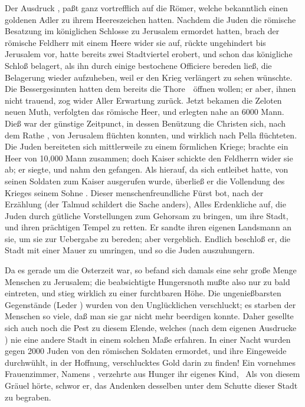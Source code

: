 \begin{aufza}
\begin{aufzb}
\item Der Ausdruck , paßt ganz vortrefflich auf die Römer, welche bekanntlich einen goldenen Adler zu ihrem Heereszeichen hatten. Nachdem die Juden die römische Besatzung im königlichen Schlosse zu Jerusalem ermordet hatten, brach der römische Feldherr  mit einem Heere wider sie auf, rückte ungehindert bis Jerusalem vor, hatte bereits zwei Stadtviertel erobert, und schon das königliche Schloß belagert, als  ihn durch einige bestochene Officiere bereden ließ, die Belagerung wieder aufzuheben, weil er den Krieg verlängert zu sehen wünschte. Die Bessergesinnten hatten dem  bereits die Thore~\ öffnen wollen; er aber, ihnen nicht trauend, zog wider Aller Erwartung zurück. Jetzt bekamen die Zeloten neuen Muth, verfolgten das römische Heer, und erlegten nahe an 6000 Mann. Dieß war der günstige Zeitpunct, in dessen Benützung die Christen sich, nach dem Rathe , von Jerusalem flüchten konnten, und wirklich nach Pella flüchteten. Die Juden bereiteten sich mittlerweile zu einem förmlichen Kriege;  brachte ein Heer von 10,000 Mann zusammen; doch Kaiser  schickte den Feldherrn  wider sie ab; er siegte, und nahm den  gefangen. Als  hierauf, da  sich entleibet hatte, von seinen Soldaten zum Kaiser ausgerufen wurde, überließ er die Vollendung des Krieges seinem Sohne . Dieser menschenfreundliche Fürst bot, nach der Erzählung  (der Talmud schildert die Sache anders), Alles Erdenkliche auf, die Juden durch gütliche Vorstellungen zum Gehorsam zu bringen, um ihre Stadt, und ihren prächtigen Tempel zu retten. Er sandte ihren eigenen Landsmann  an sie, um sie zur Uebergabe zu bereden; aber vergeblich. Endlich beschloß er, die Stadt mit einer Mauer zu umringen, und so die Juden auszuhungern.
\item Da es gerade um die Osterzeit war, so befand sich damals eine sehr große Menge Menschen zu Jerusalem; die beabsichtigte Hungersnoth mußte also nur zu bald eintreten, und stieg wirklich zu einer furchtbaren Höhe. Die ungenießbarsten Gegenstände (Leder \udgl ) wurden von den Unglücklichen verschluckt; es starben der Menschen so viele, daß man sie gar nicht mehr beerdigen konnte. Daher gesellte sich auch noch die Pest zu diesem Elende, welches (nach dem eigenen Ausdrucke ) nie eine andere Stadt in einem solchen Maße erfahren. In einer Nacht wurden gegen 2000 Juden von den römischen Soldaten ermordet, und ihre Eingeweide durchwühlt, in der Hoffnung, verschlucktes Gold darin zu finden! Ein vornehmes Frauenzimmer, Namens , verzehrte aus Hunger ihr eigenes Kind, \usw\ Als  von diesem Gräuel hörte, schwor er, das Andenken desselben unter dem Schutte dieser Stadt zu begraben.~

\end{aufzb}
\end{aufza}
